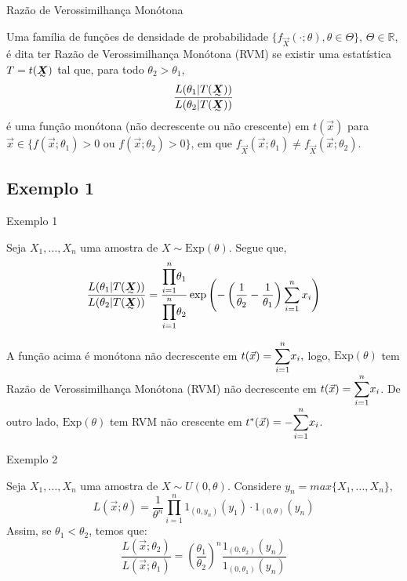 \documentclass[12pt]{beamer}
\begin{document}
\begin{frame}{Razão de Verossimilhança Monótona}
\begin{definicao}
\justifying
Uma família de funções de densidade de probabilidade $\{f_{\Vec{X}}(\cdot; \theta), \theta \in \Theta\}$, $\Theta \in \mathbb{R}$, é dita ter Razão de Verossimilhança Monótona (RVM) se existir uma estatística $T = t(\tend{X})$ tal que, para todo $\theta_2 > \theta_1$,
\[
\frac{L(\theta_1 | T(\tend{X}))}{L(\theta_2 | T(\tend{X}))}
\]
é uma função monótona (não decrescente ou não crescente) em $t(\Vec{x})$ para $\Vec{x} \in \{f(\Vec{x}; \theta_1) > 0 \text{ ou } f(\Vec{x}; \theta_2) > 0\}$, em que $f_{\Vec{X}}(\Vec{x}; \theta_1) \neq f_{\Vec{X}}(\Vec{x}; \theta_2)$.
\end{definicao}
\end{frame}

\subsection{Exemplo 1}
\begin{frame}{Exemplo 1}
\vspace{-0.3cm}
\begin{block}{}
\justifying
Seja $X_1, \ldots, X_n$ uma amostra de $X \sim \text{Exp}(\theta)$. Segue que,
\[
\frac{L(\theta_1 | T(\tend{X}))}{L(\theta_2 | T(\tend{X}))} = \frac{{\displaystyle \prod_{i=1}^{n}} \theta_1}{{\displaystyle \prod_{i=1}^{n}} \theta_2} \exp\left(-\left(\frac{1}{\theta_2} - \frac{1}{\theta_1}\right)\sum_{i=1}^{n} x_i\right)
\]
\end{block}
\pause
\vspace{-0.3cm}
\begin{block}{}
\justifying
A função acima é monótona não decrescente em $t(\Vec{x}) = {\displaystyle \sum_{i=1}^{n}} x_i,$ logo, $\text{Exp}(\theta)$ tem Razão de Verossimilhança Monótona (RVM) não decrescente em $t(\Vec{x}) = {\displaystyle \sum_{i=1}^{n}} x_i$. De outro lado, $\text{Exp}(\theta)$ tem RVM não crescente em $t^{*}(\Vec{x}) = -{\displaystyle \sum_{i=1}^{n}} x_i$.
\end{block}
\end{frame}

\begin{frame}{Exemplo 2}
\begin{block}{}
\justifying
Seja $X_1, \ldots, X_n$ uma amostra de $X \sim U(0, \theta)$. Considere $y_{n}=max\{X_1, \ldots, X_n\},$
\[
L(\Vec{x}; \theta) = \frac{1}{\theta^n} \prod_{i=1}^{n} 1_{(0, y_n)}(y_1) \cdot 1_{(0, \theta)}(y_n)
\]
Assim, se $\theta_1 < \theta_2$, temos que:
\[
\frac{L(\Vec{x}; \theta_2)}{L(\Vec{x}; \theta_1)} = \left(\frac{\theta_1}{\theta_2}\right)^n \frac{1_{(0, \theta_2)}(y_n)}{1_{(0, \theta_1)}(y_n)}
\]
\end{block}
\end{frame}
\end{document}
